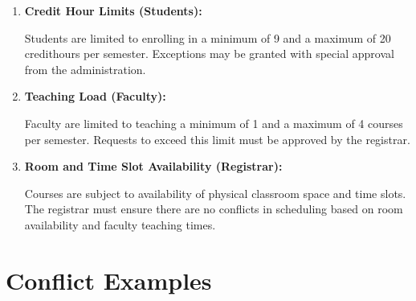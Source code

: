 \begin{enumerate}

\item{\textbf{Credit Hour Limits (Students):}}

Students are limited to enrolling in a minimum of 9 and a maximum of 20 \gls{credithours} per semester. Exceptions may be granted with special approval from the administration.

\item{\textbf{Teaching Load (Faculty):}}

Faculty are limited to teaching a minimum of 1 and a maximum of 4 courses per semester. Requests to exceed this limit must be approved by the registrar.

\item{\textbf{Room and Time Slot Availability (Registrar):}}

Courses are subject to \gls{availability} of physical classroom space and time slots. The registrar must \gls{ensure} there are no conflicts in scheduling based on room \gls{availability} and faculty teaching times.

\end{enumerate}

\section{Conflict Examples}

